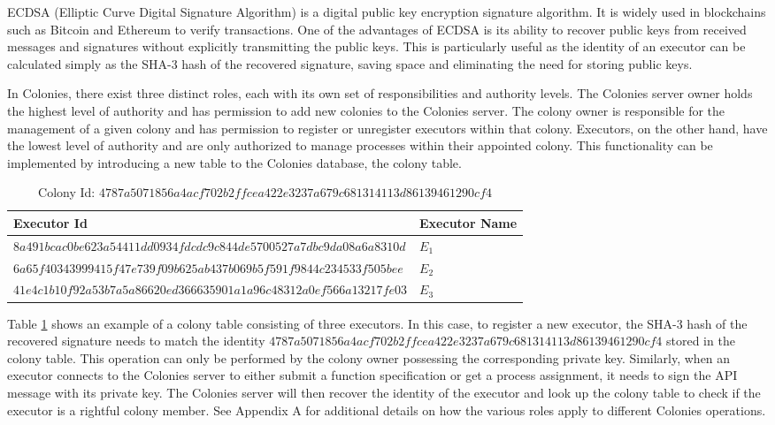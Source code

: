 \documentclass{article}
\begin{document}
ECDSA (Elliptic Curve Digital Signature Algorithm) \cite{ecdsa} is a digital public key encryption signature algorithm. It is widely used in blockchains such as Bitcoin and Ethereum to verify transactions. One of the advantages of ECDSA is its ability to recover public keys from received messages and signatures without explicitly transmitting the public keys. This is particularly useful as the identity of an executor can be calculated simply as the SHA-3 hash of the recovered signature, saving space and eliminating the need for storing public keys. 

In Colonies, there exist three distinct roles, each with its own set of responsibilities and authority levels. The Colonies server owner holds the highest level of authority and has permission to add new colonies to the Colonies server. The colony owner is responsible for the management of a given colony and has permission to register or unregister executors within that colony. Executors, on the other hand, have the lowest level of authority and are only authorized to manage processes within their appointed colony. This functionality can be implemented by introducing a new table to the Colonies database, the colony table.

\begin{table}[h]
    \caption{Colony Id: \(4787a5071856a4acf702b2ffcea422e3237a679c681314113d86139461290cf4\)}
	\centering
	\begin{tabular}{ll}
		\toprule
		\cmidrule(r){1-2}
        Executor Id & Executor Name \\
		\midrule
        \(8a491bcac0be623a54411dd0934fdcdc9c844de5700527a7dbc9da08a6a8310d\) & $E_{1}$ \\
        \(6a65f40343999415f47e739f09b625ab437b069b5f591f9844c234533f505bee\) & $E_{2}$ \\
        \(41e4c1b10f92a53b7a5a86620ed366635901a1a96c48312a0ef566a13217fe03\) & $E_{3}$ \\
		\bottomrule
	\end{tabular}
	\label{coltable}
\end{table}

Table \ref{coltable} shows an example of a colony table consisting of three executors. In this case, to register a new executor, the SHA-3 hash of the recovered signature needs to match the identity \(4787a5071856a4acf702b2ffcea422e3237a679c681314113d86139461290cf4\) stored in the colony table. This operation can only be performed by the colony owner possessing the corresponding private key. Similarly, when an executor connects to the Colonies server to either submit a function specification or get a process assignment, it needs to sign the API message with its private key. The Colonies server will then recover the identity of the executor and look up the colony table to check if the executor is a rightful colony member. See Appendix A for additional details on how the various roles apply to different Colonies operations.
\end{document}
